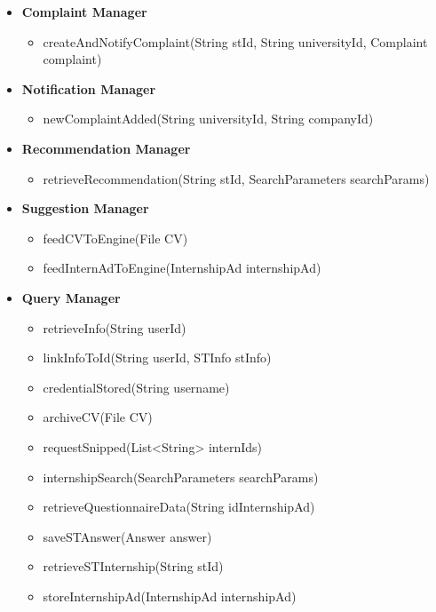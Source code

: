 \begin{itemize}
      \item \textbf{Complaint Manager}
          \begin{itemize}
              \item createAndNotifyComplaint(String stId, String universityId, Complaint complaint)
          \end{itemize}
  
      \item \textbf{Notification Manager}
          \begin{itemize}
              \item newComplaintAdded(String universityId, String companyId)
          \end{itemize}
  
      \item \textbf{Recommendation Manager}
          \begin{itemize}
              \item retrieveRecommendation(String stId, SearchParameters searchParams)
          \end{itemize}
  
      \item \textbf{Suggestion Manager}
          \begin{itemize}
              \item feedCVToEngine(File CV)
              \item feedInternAdToEngine(InternshipAd internshipAd)
          \end{itemize}
  
      \item \textbf{Query Manager}
          \begin{itemize}
              \item retrieveInfo(String userId)
              \item linkInfoToId(String userId, STInfo stInfo)
              \item credentialStored(String username)
              \item archiveCV(File CV)
              \item requestSnipped(List<String> internIds)
              \item internshipSearch(SearchParameters searchParams)
              \item retrieveQuestionnaireData(String idInternshipAd)
              \item saveSTAnswer(Answer answer)
              \item retrieveSTInternship(String stId)
              \item storeInternshipAd(InternshipAd internshipAd)
          \end{itemize}
  

\end{itemize}
